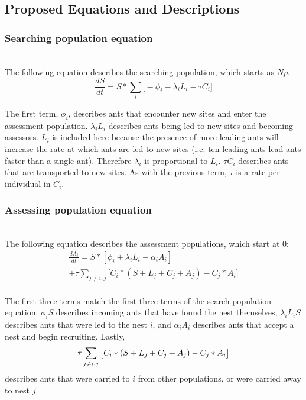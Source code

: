 \documentclass{article}
\begin{document}
\subsection{Proposed Equations and Descriptions}

\subsubsection{Searching population equation}
\hfill\\

The following equation describes the searching population, which starts as $Np$.
\begin{equation}
      \frac{dS}{dt} = S * \sum_i \big[- \phi_i - \lambda_iL_i - \tau C_i 
      \big]
\end{equation}

The first term, $\phi_i$, describes ants that encounter new sites and enter the assessment population.
$\lambda_iL_i$ describes ants being led to new sites and becoming assessors. $L_i$ is included here because the presence of more leading ants will increase the rate at which ants are led to new sites (i.e. ten leading ants lead ants faster than a single ant). Therefore $\lambda_i$ is proportional to $L_i$.
$\tau C_i$ describes ants that are transported to new sites. As with the previous term, $\tau$ is a rate per individual in $C_i$.

\subsubsection{Assessing population equation}
\hfill\\

The following equation describes the assessment populations, which start at $0$:
\begin{multline}
    \frac{dA_i}{dt} = S * [\phi_i + \lambda_iL_i - \alpha_iA_i] \\
    + \tau \sum_{j \neq i, j} \big[ C_i * {(S + L_j + C_j + A_j)} - C_j * {A_i} \big] \\ %
\end{multline}

The first three terms match the first three terms of the search-population equation.
$\phi_iS$ describes incoming ants that have found the nest themselves, $\lambda_iL_iS$ describes ants that were led to the nest $i$, and $\alpha_iA_i$ describes ants that accept a nest and begin recruiting.
Lastly, $$\tau \sum_{j \neq i, j} \big[ C_i * {(S + L_j + C_j + A_j)} - C_j * {A_i} \big] \\ %
$$ describes ants that were carried to $i$ from other populations, or were carried away to nest $j$. \\
\end{document}
